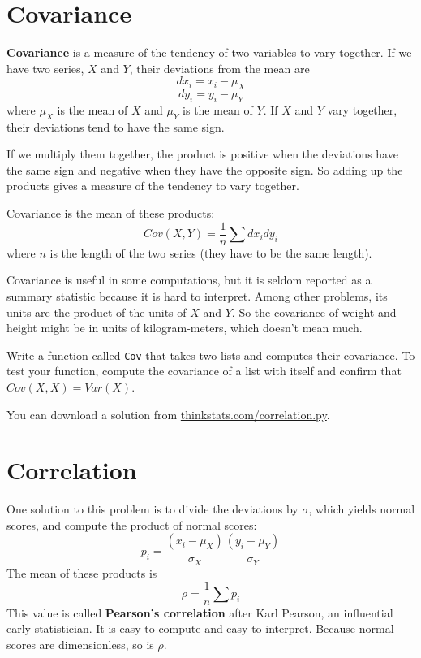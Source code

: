 \documentclass[12pt]{book}
\begin{document}

\section{Covariance}


{\bf Covariance} is a measure of the tendency of two variables
to vary together.  If we have two series, $X$ and $Y$, their
deviations from the mean are
%
\[ dx_i = x_i - \mu_X \]
%
\[ dy_i = y_i - \mu_Y \]
%
where $\mu_X$ is the mean of $X$ and $\mu_Y$ is the mean of $Y$.
If $X$ and $Y$ vary together, their deviations tend to have the same
sign.

If we multiply them together, the product is positive when the
deviations have the same sign and negative when they have the opposite
sign.  So adding up the products gives a measure of the tendency to
vary together.

Covariance is the mean of these products:
%
\[ Cov(X,Y) = \frac{1}{n} \sum dx_i dy_i \]
%
where $n$ is the length of the two series (they have to be the same
length).

Covariance is useful in some computations, but
it is seldom reported as a summary statistic because it is hard to
interpret.  Among other problems, its units are the product of the
units of $X$ and $Y$.  So the covariance of weight and height might be
in units of kilogram-meters, which doesn't mean much.

\begin{exercise}
Write a function called {\tt Cov} that takes two lists
and computes their covariance.  To test your function, compute
the covariance of a list with itself and confirm that
$Cov(X, X) = Var(X)$.

You can download a solution from
\url{thinkstats.com/correlation.py}.


\end{exercise}


\section{Correlation}


One solution to this problem is to divide the deviations by $\sigma$,
which yields normal scores, and compute the product of normal scores:
%
\[ p_i = \frac{(x_i - \mu_X)}{\sigma_X} \frac{(y_i - \mu_Y)}{\sigma_Y} \]
%
The mean of these products is
%
\[ \rho = \frac{1}{n} \sum p_i \]
%
This value is called {\bf Pearson's correlation} after Karl Pearson,
an influential early statistician.  It is easy to compute and easy to
interpret.  Because normal scores are dimensionless, so is $\rho$.
\end{document}
